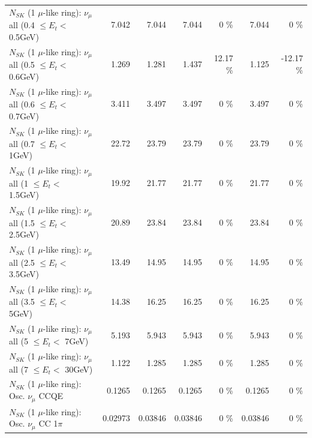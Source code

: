 \begin{table}
\begin{tabular}{| l | r | r | r  r | r  r |}
       $N_{SK}$ (1 $\mu$-like ring): $\nu_{\mu}$ all (0.4 $\leq E_{t} <$ 0.5GeV) &           7.042 &           7.044 &           7.044 &        0 \%  &           7.044 &        0 \%  \\ 
       $N_{SK}$ (1 $\mu$-like ring): $\nu_{\mu}$ all (0.5 $\leq E_{t} <$ 0.6GeV) &           1.269 &           1.281 &           1.437 &    12.17 \%  &           1.125 &   -12.17 \%  \\ 
       $N_{SK}$ (1 $\mu$-like ring): $\nu_{\mu}$ all (0.6 $\leq E_{t} <$ 0.7GeV) &           3.411 &           3.497 &           3.497 &        0 \%  &           3.497 &        0 \%  \\ 
         $N_{SK}$ (1 $\mu$-like ring): $\nu_{\mu}$ all (0.7 $\leq E_{t} <$ 1GeV) &           22.72 &           23.79 &           23.79 &        0 \%  &           23.79 &        0 \%  \\ 
         $N_{SK}$ (1 $\mu$-like ring): $\nu_{\mu}$ all (1 $\leq E_{t} <$ 1.5GeV) &           19.92 &           21.77 &           21.77 &        0 \%  &           21.77 &        0 \%  \\ 
       $N_{SK}$ (1 $\mu$-like ring): $\nu_{\mu}$ all (1.5 $\leq E_{t} <$ 2.5GeV) &           20.89 &           23.84 &           23.84 &        0 \%  &           23.84 &        0 \%  \\ 
       $N_{SK}$ (1 $\mu$-like ring): $\nu_{\mu}$ all (2.5 $\leq E_{t} <$ 3.5GeV) &           13.49 &           14.95 &           14.95 &        0 \%  &           14.95 &        0 \%  \\ 
         $N_{SK}$ (1 $\mu$-like ring): $\nu_{\mu}$ all (3.5 $\leq E_{t} <$ 5GeV) &           14.38 &           16.25 &           16.25 &        0 \%  &           16.25 &        0 \%  \\ 
           $N_{SK}$ (1 $\mu$-like ring): $\nu_{\mu}$ all (5 $\leq E_{t} <$ 7GeV) &           5.193 &           5.943 &           5.943 &        0 \%  &           5.943 &        0 \%  \\ 
          $N_{SK}$ (1 $\mu$-like ring): $\nu_{\mu}$ all (7 $\leq E_{t} <$ 30GeV) &           1.122 &           1.285 &           1.285 &        0 \%  &           1.285 &        0 \%  \\ 
\hline
\hline
                               $N_{SK}$ (1 $\mu$-like ring): Osc. $\nu_\mu$ CCQE &          0.1265 &          0.1265 &          0.1265 &        0 \%  &          0.1265 &        0 \%  \\ 
                          $N_{SK}$ (1 $\mu$-like ring): Osc. $\nu_\mu$ CC 1$\pi$ &         0.02973 &         0.03846 &         0.03846 &        0 \%  &         0.03846 &        0 \%  \\ 

\end{tabular}
\end{table}
